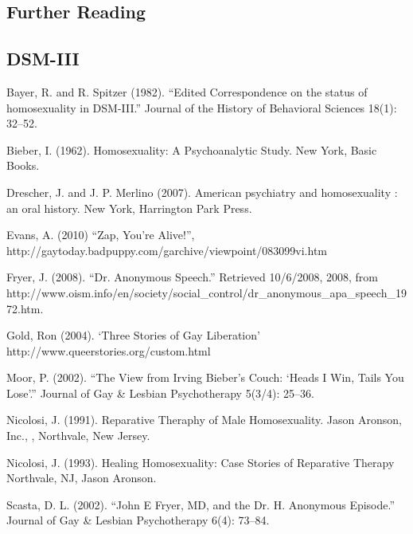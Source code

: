 \begin{refsection}
\begin{appendices}
\let\svaddcontentsline\addcontentsline
\renewcommand\addcontentsline[3]{%
  \ifthenelse{\equal{#1}{lof}}{}%
  {\ifthenelse{\equal{#1}{lot}}{}{\svaddcontentsline{#1}{#2}{#3}}}}





\pagebreak 

\chapter{Further Reading}
\label{furtherreading}

\section{DSM-III}
\label{dsm-iii}

Bayer, R. and R. Spitzer (1982). ``Edited Correspondence on the status of homosexuality in DSM-III.'' Journal of the History of Behavioral Sciences 18(1): 32--52.

Bieber, I. (1962). Homosexuality: A Psychoanalytic Study. New York, Basic Books.

Drescher, J. and J. P. Merlino (2007). American psychiatry and homosexuality : an oral history. New York, Harrington Park Press.

Evans, A. (2010) ``Zap, You're Alive!'', http:\slash \slash gaytoday.badpuppy.com\slash garchive\slash viewpoint\slash 083099vi.htm

Fryer, J. (2008). ``Dr. Anonymous Speech.'' Retrieved 10\slash 6\slash 2008, 2008, from http:\slash \slash www.oism.info\slash en\slash society\slash social\_control\slash dr\_anonymous\_apa\_speech\_1972.htm.

Gold, Ron (2004). `Three Stories of Gay Liberation' http:\slash \slash www.queerstories.org\slash custom.html

Moor, P. (2002). ``The View from Irving Bieber's Couch: `Heads I Win, Tails You Lose'.'' Journal of Gay \& Lesbian Psychotherapy 5(3\slash 4): 25--36.

Nicolosi, J. (1991). Reparative Theraphy of Male Homosexuality. Jason Aronson, Inc., , Northvale, New Jersey.

Nicolosi, J. (1993). Healing Homosexuality: Case Stories of Reparative Therapy Northvale, NJ, Jason Aronson.

Scasta, D. L. (2002). ``John E Fryer, MD, and the Dr. H. Anonymous Episode.'' Journal of Gay \& Lesbian Psychotherapy 6(4): 73--84.


\end{appendices}
\end{refsection}
